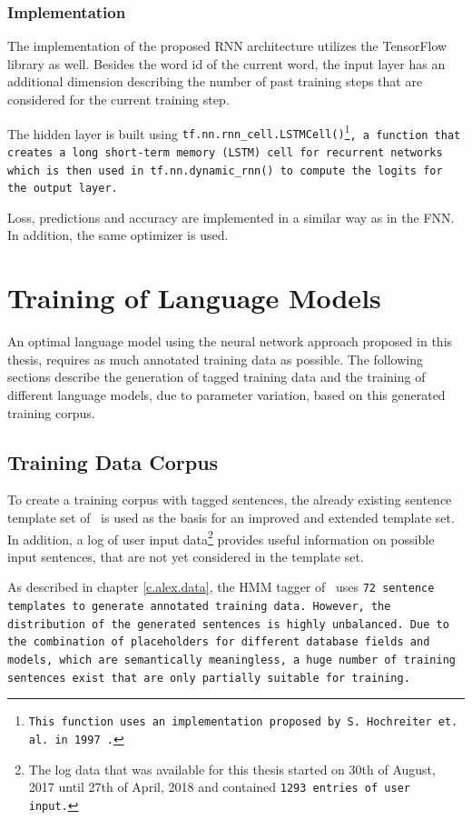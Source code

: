 \subsection{Implementation}\label{c.postagging.rnn.implementation}
The implementation of the proposed RNN architecture utilizes the TensorFlow library as well. Besides the word id of the current word, the input layer has an additional dimension describing the number of past training steps that are considered for the current training step.

The hidden layer is built using \tt{tf.nn.rnn\_cell.LSTMCell()}\footnote{This function uses an implementation proposed by S. Hochreiter et. al. in 1997 \cite{hochreiter1997}.}, a function that creates a long short-term memory (LSTM) cell for recurrent networks which is then used in \tt{tf.nn.dynamic\_rnn()} to compute the logits for the output layer.

Loss, predictions and accuracy are implemented in a similar way as in the FNN. In addition, the same optimizer is used.

\chapter{Training of Language Models}\label{c.training}
An optimal language model using the neural network approach proposed in this thesis, requires as much annotated training data as possible. The following sections describe the generation of tagged training data and the training of different language models, due to parameter variation, based on this generated training corpus.

\section{Training Data Corpus}\label{c.training.data}
To create a training corpus with tagged sentences, the already existing sentence template set of \Alex\ is used as the basis for an improved and extended template set. In addition, a log of user input data\footnote{The log data that was available for this thesis started on 30th of August, 2017 until 27th of April, 2018 and contained \tt{1293} entries of user input.} provides useful information on possible input sentences, that are not yet considered in the template set.

As described in chapter \ref{c.alex.data}, the HMM tagger of \Alex\ uses \tt{72} sentence templates to generate annotated training data. However, the distribution of the generated sentences is highly unbalanced. Due to the combination of placeholders for different database fields and models, which are semantically meaningless, a huge number of training sentences exist that are only partially suitable for training.

